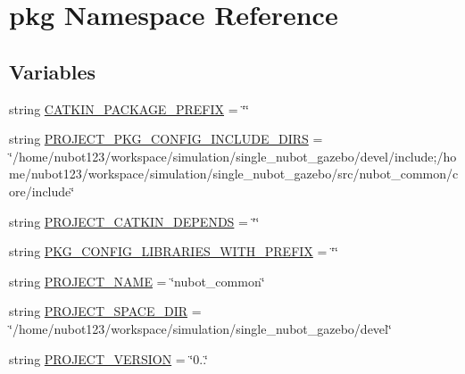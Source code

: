 \hypertarget{namespacepkg}{\section{pkg Namespace Reference}
\label{namespacepkg}
}
\subsection*{Variables}
\begin{DoxyCompactItemize}
\item 
string \hyperlink{namespacepkg_ae26c7a5a06b7d738f4d210ca449e6bee}{C\-A\-T\-K\-I\-N\-\_\-\-P\-A\-C\-K\-A\-G\-E\-\_\-\-P\-R\-E\-F\-I\-X} = \char`\"{}\char`\"{}
\item 
string \hyperlink{namespacepkg_a2760bf8266ff58da440f65ee91b203ab}{P\-R\-O\-J\-E\-C\-T\-\_\-\-P\-K\-G\-\_\-\-C\-O\-N\-F\-I\-G\-\_\-\-I\-N\-C\-L\-U\-D\-E\-\_\-\-D\-I\-R\-S} = \char`\"{}/home/nubot123/workspace/simulation/single\-\_\-nubot\-\_\-gazebo/devel/include;/home/nubot123/workspace/simulation/single\-\_\-nubot\-\_\-gazebo/src/nubot\-\_\-common/core/include\char`\"{}
\item 
string \hyperlink{namespacepkg_a17c18447fad253ee1c0d76deec88028c}{P\-R\-O\-J\-E\-C\-T\-\_\-\-C\-A\-T\-K\-I\-N\-\_\-\-D\-E\-P\-E\-N\-D\-S} = \char`\"{}\char`\"{}
\item 
string \hyperlink{namespacepkg_a433e30cecb4a0123a7c4b384d168e336}{P\-K\-G\-\_\-\-C\-O\-N\-F\-I\-G\-\_\-\-L\-I\-B\-R\-A\-R\-I\-E\-S\-\_\-\-W\-I\-T\-H\-\_\-\-P\-R\-E\-F\-I\-X} = \char`\"{}\char`\"{}
\item 
string \hyperlink{namespacepkg_a7dfbe99257c26f5e4a3a5483995d9ddc}{P\-R\-O\-J\-E\-C\-T\-\_\-\-N\-A\-M\-E} = \char`\"{}nubot\-\_\-common\char`\"{}
\item 
string \hyperlink{namespacepkg_a3f0f1b4bc03c596525e025539ca4332f}{P\-R\-O\-J\-E\-C\-T\-\_\-\-S\-P\-A\-C\-E\-\_\-\-D\-I\-R} = \char`\"{}/home/nubot123/workspace/simulation/single\-\_\-nubot\-\_\-gazebo/devel\char`\"{}
\item 
string \hyperlink{namespacepkg_ab1037914b9286bb61855131c06149648}{P\-R\-O\-J\-E\-C\-T\-\_\-\-V\-E\-R\-S\-I\-O\-N} = \char`\"{}0..\char`\"{}
\end{DoxyCompactItemize}


